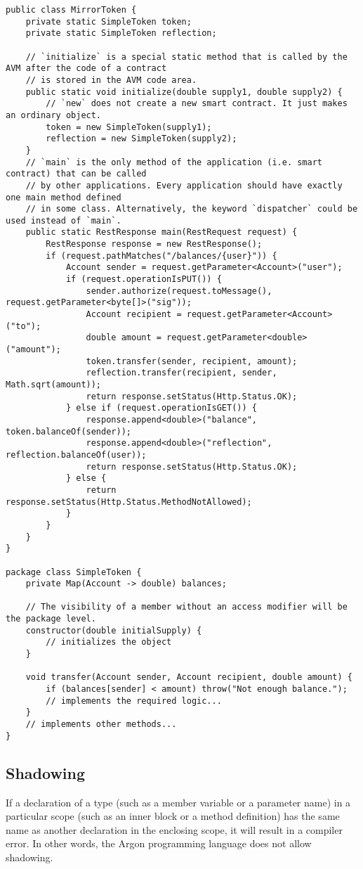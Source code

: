 \begin{lstlisting}[frame=TB, float, title=A simple Argon application,label={lst:code1}]
public class MirrorToken {
    private static SimpleToken token;
    private static SimpleToken reflection;

    // `initialize` is a special static method that is called by the AVM after the code of a contract
    // is stored in the AVM code area.
    public static void initialize(double supply1, double supply2) {
        // `new` does not create a new smart contract. It just makes an ordinary object.
        token = new SimpleToken(supply1);
        reflection = new SimpleToken(supply2);
    }
    // `main` is the only method of the application (i.e. smart contract) that can be called
    // by other applications. Every application should have exactly one main method defined
    // in some class. Alternatively, the keyword `dispatcher` could be used instead of `main`.
    public static RestResponse main(RestRequest request) {
        RestResponse response = new RestResponse();
        if (request.pathMatches("/balances/{user}")) {
            Account sender = request.getParameter<Account>("user");
            if (request.operationIsPUT()) {
                sender.authorize(request.toMessage(), request.getParameter<byte[]>("sig"));
                Account recipient = request.getParameter<Account>("to");
                double amount = request.getParameter<double>("amount");
                token.transfer(sender, recipient, amount);
                reflection.transfer(recipient, sender, Math.sqrt(amount));
                return response.setStatus(Http.Status.OK);
            } else if (request.operationIsGET()) {
                response.append<double>("balance", token.balanceOf(sender));
                response.append<double>("reflection", reflection.balanceOf(user));
                return response.setStatus(Http.Status.OK);
            } else {
                return response.setStatus(Http.Status.MethodNotAllowed);
            }
        }
    }
}

package class SimpleToken {
    private Map(Account -> double) balances;

    // The visibility of a member without an access modifier will be the package level.
    constructor(double initialSupply) {
        // initializes the object
    }

    void transfer(Account sender, Account recipient, double amount) {
        if (balances[sender] < amount) throw("Not enough balance.");
        // implements the required logic...
    }
    // implements other methods...
}
\end{lstlisting}

\subsection{Shadowing}\label{subsec:shadowing}

If a declaration of a type (such as a member variable or a parameter name) in a particular scope (such as an
inner block or a method definition) has the same name as another declaration in the enclosing scope, it will
result in a compiler error. In other words, the Argon programming language does not allow shadowing.
